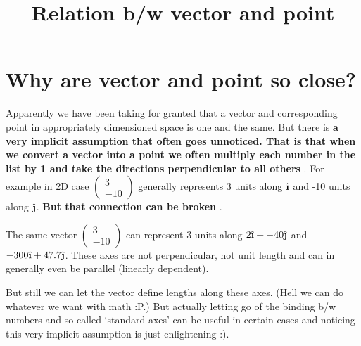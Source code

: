 \documentclass[12pt]{article}
\title{Relation b/w vector and point}
\author{}
\date{}
\newcommand{\comment}[1]{}
\newcommand{\ihat}{\hat{\textbf{\i}}}
\newcommand{\jhat}{\hat{\textbf{\j}}}
\begin{document}
\maketitle

\section{Why are vector and point so close?}
Apparently we have been taking for granted that a vector and corresponding point in appropriately dimensioned space is one and the same. But there is \textbf{a very implicit assumption that often goes unnoticed. That is that when we convert a vector into a point we often multiply each number in the list by 1 and take the directions perpendicular to all others} . For example in 2D case $ \comment{Column-Vector: 3, -10} \begin{pmatrix} 3 \\  -10 \end{pmatrix} $ generally represents 3 units along $ \ihat $ and -10 units along $ \jhat $. \textbf{But that connection can be broken} .

The same vector $ \comment{Column-Vector: 3, -10} \begin{pmatrix} 3 \\  -10 \end{pmatrix} $ can represent 3 units along $ 2\ihat + -40\jhat $ and $ -300\ihat + 47.7\jhat $. These axes are not perpendicular, not unit length and can in generally even be parallel (linearly dependent).

But still we can let the vector define lengths along these axes. (Hell we can do whatever we want with math :P.) But actually letting go of the binding b/w numbers and so called `standard axes' can be useful in certain cases and noticing this very implicit assumption is just enlightening :).
\end{document}
